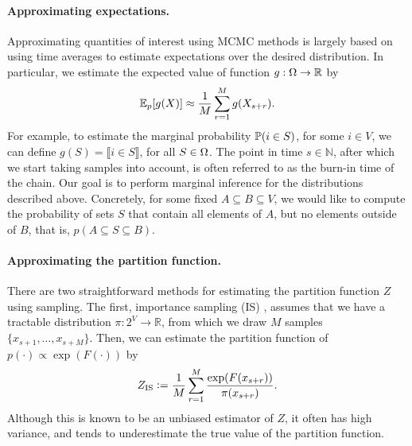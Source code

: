\paragraph{Approximating expectations.}
Approximating quantities of interest using MCMC methods is largely based on using time averages to estimate expectations over the desired distribution.
In particular, we estimate the expected value of function $g : \ss \to \mathbb{R}$ by
\begin{align} \label{eq:exp_approx}
\E_p[g(X)] \approx \frac{1}{M}\sum_{r=1}^{M} g(X_{s + r}).
\end{align}
For example, to estimate the marginal probability $\P(i \in S)$, for some $i \in V$, we can define $g(S) = \llbracket i \in S \rrbracket$, for all $S \in \ss$.
The point in time $s \in \mathbb{N}$, after which we start taking samples into account, is often referred to as the burn-in time of the chain.
Our goal is to perform marginal inference for the distributions described above.
Concretely, for some fixed $A \subseteq B \subseteq V$, we would like to compute the probability of sets $S$ that contain all elements of $A$, but no elements outside of $B$, that is, $p(A \subseteq S \subseteq B)$.

\paragraph{Approximating the partition function.}
There are two straightforward methods for estimating the partition function $Z$ using sampling.
The first, importance sampling (IS) \citep{ais}, assumes that we have a tractable distribution $\pi : 2^V \to \mathbb{R}$, from which we draw $M$ samples $\{x_{s+1}, \ldots, x_{s+M}\}$.
Then, we can estimate the partition function of $p(\cdot) \propto \exp(F(\cdot))$ by
\begin{align} \label{eq:is}
Z_{\textrm{IS}} \defeq \frac{1}{M} \sum_{r = 1}^{M} \frac{\exp(F(x_{s+r}))}{\pi(x_{s+r})}.
\end{align}
Although this is known to be an unbiased estimator of $Z$, it often has high variance, and tends to underestimate the true value of the partition function.

